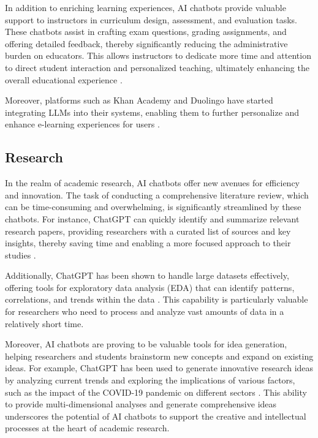 In addition to enriching learning experiences, AI chatbots provide valuable support to instructors in curriculum design, assessment, and evaluation tasks. These chatbots assist in crafting exam questions, grading assignments, and offering detailed feedback, thereby significantly reducing the administrative burden on educators. This allows instructors to dedicate more time and attention to direct student interaction and personalized teaching, ultimately enhancing the overall educational experience \cite{dam2024complete}.

Moreover, platforms such as Khan Academy and Duolingo have started integrating LLMs into their systems, enabling them to further personalize and enhance e-learning experiences for users \cite{khan2023harnessing, Duolingo2023}.

\subsection{Research}

In the realm of academic research, AI chatbots offer new avenues for efficiency and innovation. The task of conducting a comprehensive literature review, which can be time-consuming and overwhelming, is significantly streamlined by these chatbots. For instance, ChatGPT can quickly identify and summarize relevant research papers, providing researchers with a curated list of sources and key insights, thereby saving time and enabling a more focused approach to their studies \cite{chandha2023setting}.

Additionally, ChatGPT has been shown to handle large datasets effectively, offering tools for exploratory data analysis (EDA) that can identify patterns, correlations, and trends within the data \cite{jiang2023}. This capability is particularly valuable for researchers who need to process and analyze vast amounts of data in a relatively short time.

Moreover, AI chatbots are proving to be valuable tools for idea generation, helping researchers and students brainstorm new concepts and expand on existing ideas. For example, ChatGPT has been used to generate innovative research ideas by analyzing current trends and exploring the implications of various factors, such as the impact of the COVID-19 pandemic on different sectors \cite{temsah2023reflection}. This ability to provide multi-dimensional analyses and generate comprehensive ideas underscores the potential of AI chatbots to support the creative and intellectual processes at the heart of academic research.

